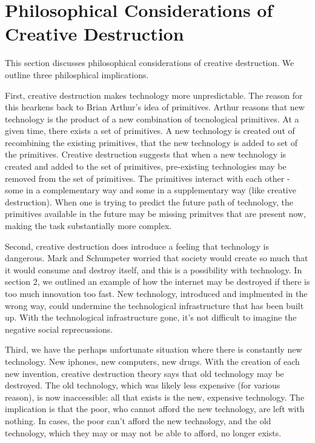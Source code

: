\documentclass[11pt]{article}
\begin{document}
\section{Philosophical Considerations of Creative Destruction}
This section discusses philosophical considerations of creative destruction.
We outline three philosphical implications.

First, creative destruction makes technology more unpredictable.
The reason for this hearkens back to Brian Arthur's idea of primitives. 
Arthur reasons that new technology is the product of a new combination of tecnological primitives. 
At a given time, there exists a set of primitives. 
A new technology is created out of recombining the existing primitives, that the new technology is added to set of the primitives.
Creative destruction suggests that when a new technology is created and added to the set of primitives, pre-existing technologies may be removed from the set of primitives.
The primitives interact with each other - some in a complementary way and some in a supplementary way (like creative destruction). 
When one is trying to predict the future path of technology, the primitives available in the future may be missing primitves that are present now, making the task substantially more complex.

Second, creative destruction does introduce a feeling that technology is dangerous.
Mark and Schumpeter worried that society would create so much that it would consume and destroy itself, and this is a possibility with technology.
In section 2, we outlined an example of how the internet may be destroyed if there is too much innovation too fast.
New technology, introduced and implmented in the wrong way, could undermine the technological infrastructure that has been built up. 
With the technological infrastructure gone, it's not difficult to imagine the negative social reprecussions.

Third, we have the perhaps unfortunate situation where there is constantly new technology.
New iphones, new computers, new drugs.
With the creation of each new invention, creative destruction theory says that old technology may be destroyed.
The old technology, which was likely less expensive (for various reason), is now inaccessible: all that exists is the new, expensive technology.
The implication is that the poor, who cannot afford the new technology, are left with nothing. 
In cases, the poor can't afford the new technology, and the old technology, which they may or may not be able to afford, no longer exists.
\end{document}
